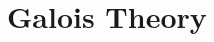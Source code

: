 \documentclass[a4paper,12pt]{book}
\begin{document}
\maketitle

\frontmatter

\tableofcontents

\mainmatter

\chapter{Galois Theory}



\backmatter



\end{document}
